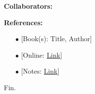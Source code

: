 \documentclass[11pt]{article}
\begin{document}
\newpage  %

\begin{center}
\textbf{Collaborators:}
\end{center}
\vfill 

\begin{center}
\textbf{References:}
\end{center}
\begin{itemize}
\item[$\bullet$] [Book(s): Title, Author]
\item[$\bullet$] [Online: \href{http://example.com/}{Link}]
\item[$\bullet$] [Notes: \href{http://example.com/}{Link}]
\end{itemize}

\vfill
\begin{center}
Fin.
\end{center}
\vfill
\end{document}
